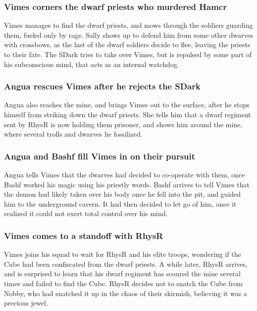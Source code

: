 \subsubsection{\Gls{Vimes} corners the dwarf priests who murdered \Gls{Hamcr}}
\Gls{Vimes} manages to find the dwarf priests, and mows through the soldiers guarding them, fueled
only by rage. \Gls{Sally} shows up to defend him from some other dwarves with crossbows, as the
last of the dwarf soldiers decide to flee, leaving the priests to their fate. The \Gls{SDark} tries
to take over \Gls{Vimes}, but is repulsed by some part of his subconscious mind, that acts as an
internal watchdog.

\subsubsection{\Gls{Angua} rescues \Gls{Vimes} after he rejects the \Gls{SDark}}
\Gls{Angua} also reaches the mine, and brings \Gls{Vimes} out to the surface, after he stops himself
from striking down the dwarf priests. She tells him that a dwarf regiment sent by \Gls{RhysR} is
now holding them prisoner, and shows him around the mine, where several trolls and dwarves lie
fossilized.

\subsubsection{\Gls{Angua} and \Gls{Bashf} fill \Gls{Vimes} in on their pursuit}
\Gls{Angua} tells \Gls{Vimes} that the dwarves had decided to co-operate with them, once \Gls{Bashf}
worked his magic using his priestly words. \Gls{Bashf} arrives to tell \Gls{Vimes} that the demon
had likely taken over his body once he fell into the pit, and guided him to the underground cavern.
It had then decided to let go of him, once it realized it could not exert total control over his
mind.

\subsubsection{\Gls{Vimes} comes to a standoff with \Gls{RhysR}}
\Gls{Vimes} joins his squad to wait for \Gls{RhysR} and his elite troops, wondering if the Cube had
been confiscated from the dwarf priests. A while later, \Gls{RhysR} arrives, and is surprised to
learn that his dwarf regiment has scoured the mine several times and failed to find the Cube.
\Gls{RhysR} decides not to snatch the Cube from \Gls{Nobby}, who had snatched it up in the chaos of
their skirmish, believing it was a precious jewel.

